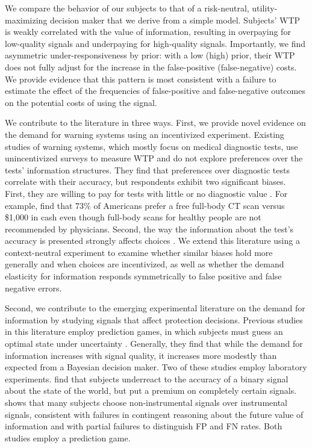 \documentclass[12pt,a4paper]{article}
\begin{document}
We compare the behavior of our subjects to that of a risk-neutral, utility-maximizing decision maker that we derive from a simple model. Subjects' WTP is weakly correlated with the value of information, resulting in overpaying for low-quality signals and underpaying for high-quality signals. Importantly, we find asymmetric under-responsiveness by prior: 
with a low (high) prior, their WTP does not fully adjust for the increase in the false-positive (false-negative) costs.
We provide evidence that this pattern is most consistent with a failure to estimate the effect of the frequencies of false-positive and false-negative outcomes on the potential costs of using the signal. 

We contribute to the literature in three ways. First, we provide novel evidence on the demand for warning systems using an incentivized experiment. Existing studies of warning systems, which mostly focus on medical diagnostic tests, use unincentivized surveys to measure WTP and do not explore preferences over the tests' information structures. They find that preferences over diagnostic tests correlate with their accuracy, but respondents exhibit two significant biases. First, they are willing to pay for tests with little or no diagnostic value \citep{schwartz_enthusiasm_2004, neumann_willingness--pay_2012}. For example, \citet{schwartz_enthusiasm_2004} find that 73\% of Americans prefer a free full-body CT scan versus \$1,000 in cash even though full-body scans for healthy people are not recommended by physicians. Second, the way the information about the test's accuracy is presented strongly affects choices \citep{howard_does_2009}. We extend this literature using a context-neutral experiment to examine whether similar biases hold more generally and when choices are incentivized, as well as whether the demand elasticity for information responds symmetrically to false positive and false negative errors. 

Second, we contribute to the emerging experimental literature on the demand for information by studying signals that affect protection decisions. Previous studies in this literature employ prediction games, in which subjects must guess an optimal state under uncertainty \citep{hoffman_how_2016, ambuehl_belief_2018, xu_revealed_2022, MontanariNunnari2023}. Generally, they find that while the demand for information increases with signal quality, it increases more modestly than expected from a Bayesian decision maker. Two of these studies employ laboratory experiments. \citet{ambuehl_belief_2018} find that subjects underreact to the accuracy of a binary signal about the state of the world, but put a premium on completely certain signals. \citet{xu_revealed_2022} shows that many subjects choose non-instrumental signals over instrumental signals, consistent with failures in contingent reasoning about the future value of information and with partial failures to distinguish FP and FN rates. Both studies employ a prediction game.
\end{document}
